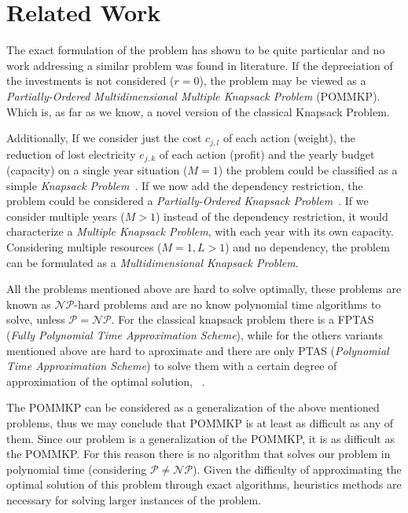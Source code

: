 \section{Related Work} 
\label{sec:relat}

The exact formulation of the problem has shown to be quite particular and
no work addressing a similar problem was found in literature.
If the depreciation of the investments is not considered ($r=0$),
the problem may  be viewed as a \textit{Partially-Ordered Multidimensional
Multiple Knapsack Problem} (POMMKP). Which is, as far as we know, a
novel version of the classical Knapsack Problem.

Additionally, If we consider just the cost $c_{j,l}$ of each action (weight), the
reduction of lost electricity  $e_{j,k}$ of each action (profit) and the yearly budget (capacity)
on a single year situation ($M=1$) the problem could be classified as a simple
\textit{Knapsack Problem}~\cite{pisinger1995}.
If we now add the dependency restriction, the problem could be considered
a \textit{Partially-Ordered Knapsack Problem}~\cite{pok2002}.
If we consider multiple years ($M > 1$) instead of the dependency restriction, it would characterize
a \textit{Multiple Knapsack Problem}, with each year with its own capacity.
Considering multiple resources ($M=1, L > 1$) and no dependency, the problem can be formulated as a
\textit{Multidimensional Knapsack Problem}.

All the problems mentioned above are hard to solve optimally, these problems are known 
as $\mathcal{NP}$-hard problems and are no know polynomial time algorithms to solve, unless $\mathcal{P} = \mathcal{NP}$.
For the classical knapsack problem there is a FPTAS (\textit{Fully Polynomial Time Approximation Scheme}),
while for the others variants mentioned above are hard to aproximate and there are only PTAS 
(\textit{Polynomial Time Approximation Scheme}) to solve them with a certain degree of 
approximation of the optimal solution, ~\cite{pok2002, puchinger2006core, dawande2000approximation}. 

The POMMKP can be considered as a generalization of the above mentioned problems,
thus we may conclude that POMMKP is at least as difficult as any of them.
Since our problem is a generalization of the POMMKP, it is as difficult as the POMMKP.
For this reason there is no algorithm that solves our problem in polynomial time (considering
$\mathcal{P} \ne \mathcal{NP}$).
Given the difficulty of approximating the optimal solution of this problem through exact algorithms, heuristics methods are necessary 
for solving larger instances of the problem.
